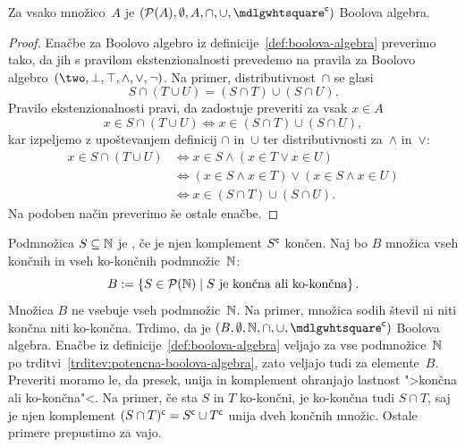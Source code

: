 \begin{trditev}
  \label{trditev:potencna-boolova-algebra}
  Za vsako množico~$A$ je $(\pow{A}, \emptyset, A, {\cap}, {\cup}, \compl{\Box})$ Boolova algebra.
\end{trditev}

\begin{proof}
  Enačbe za Boolovo algebro iz definicije~\ref{def:boolova-algebra} preverimo tako, da jih s pravilom ekstenzionalnosti prevedemo na pravila za Boolovo algebro~$(\two, \bot, \top, {\land}, {\lor}, {\neg})$.
  Na primer, distributivnost~$\cap$ se glasi
  \begin{equation*}
    S \cap (T \cup U) = (S \cap T) \cup (S \cap U).
  \end{equation*}
  Pravilo ekstenzionalnosti pravi, da zadostuje preveriti za vsak $x \in A$
  \begin{equation*}
    x \in S \cap (T \cup U) \iff
    x \in (S \cap T) \cup (S \cap U),
  \end{equation*}
  kar izpeljemo z upoštevanjem definicij $\cap$ in~$\cup$ ter distributivnosti za~$\land$ in~$\lor$:
  \begin{align*}
    x \in S \cap (T \cup U)
    &\iff x \in S \land (x \in T \lor x \in U) \\
    &\iff (x \in S \land x \in T) \lor (x \in S \land x \in U) \\
    &\iff x \in (S \cap T) \cup (S \cap U).
  \end{align*}
  Na podoben način preverimo še ostale enačbe.
\end{proof}

\begin{zgled}
  \label{zgled:koncne-in-ko-koncne}
  Podmnožica $S \subseteq \mathbb{N}$ je , če je njen komplement $S^{\mathsf{c}}$ končen.
  Naj bo $B$ množica vseh končnih in vseh ko-končnih podmnožic~$\mathbb{N}$:
  \begin{equation*}
    B \mathrel{{:}{=}} \left\{S \in \mathcal{P}(\mathbb{N}) \; \middle| \; \text{$S$ je končna ali ko-končna}\right\}.
  \end{equation*}
  Množica $B$ ne vsebuje vseh podmnožic~$\mathbb{N}$. Na primer, množica sodih števil ni niti končna niti ko-končna.
  Trdimo, da je $(B, \emptyset, \NN, {\cap}, {\cup}, \compl{\Box})$ Boolova algebra.
  Enačbe iz definicije~\ref{def:boolova-algebra} veljajo za vse podmnožice~$\mathbb{N}$ po trditvi~\ref{trditev:potencna-boolova-algebra}, zato veljajo tudi za elemente~$B$.
  Preveriti moramo le, da presek, unija in komplement ohranjajo lastnost ">končna ali ko-končna"<.
  Na primer, če sta $S$ in $T$ ko-končni, je ko-končna tudi $S \cap T$, saj je njen komplement $(S \cap T)^{\mathsf{c}} = S^{\mathsf{c}} \cup T^{\mathsf{c}}$ unija dveh končnih množic.
  Ostale primere prepustimo za vajo.
\end{zgled}


